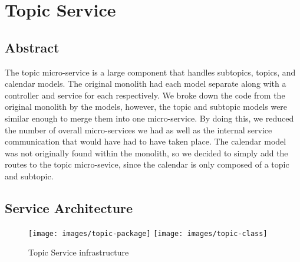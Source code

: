 \chapter{Topic Service}
\section{Abstract}
The topic micro-service is a large component that handles subtopics, topics, and calendar models. The original monolith had each model separate along with a controller and service for each respectively. We broke down the code from the original monolith by the models, however, the topic and subtopic models were similar enough to merge them into one micro-service. By doing this, we reduced the number of overall micro-services we had as well as the internal service communication that would have had to have taken place. The calendar model was not originally found within the monolith, so we decided to simply add the routes to the topic micro-sevice, since the calendar is only composed of a topic and subtopic.

\section{Service Architecture}

\begin{figure}[htp]
\centering
\texttt{[image: images/topic-package]}
\texttt{[image: images/topic-class]}
\caption{Topic Service infrastructure}
\label{fig:lion}
\end{figure}


